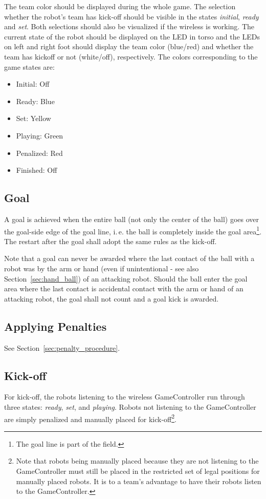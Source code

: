 \documentclass[12pt]{article}
\newcommand{\ie}{\mbox{i.\,e.}\xspace}
\begin{document}
The team color should be displayed during the whole game. The
selection whether the robot's team has kick-off should be visible in
the states \emph{initial}, \emph{ready} and \emph{set}. Both
selections should also be visualized if the wireless is working. The current state of the robot should be displayed on the LED in torso and the LEDs on left and right foot should display the team color (blue/red) and whether the team has kickoff or not (white/off), respectively. The colors corresponding to the game states are:

\begin{itemize}
 \item Initial: Off
 \item Ready: Blue
 \item Set: Yellow
 \item Playing: Green
 \item Penalized: Red
 \item Finished: Off
\end{itemize}

\subsection{Goal}
A goal is achieved when the entire ball (not only the center of the
ball) goes over the goal-side edge of the goal line, \ie the ball
is completely inside the goal area\footnote{The goal line is part of
the field.}. The restart after the goal shall adopt the same
rules as the kick-off.

Note that a goal can never be awarded where the last contact of the ball with a robot was by the arm or hand (even if unintentional - see also Section~\ref{sec:hand_ball}) of an attacking robot. Should the ball enter the goal area where the last contact is accidental contact with the arm or hand of an attacking robot, the goal shall not count and a goal kick is awarded.

\subsection{Applying Penalties}
See Section~\ref{sec:penalty_procedure}.

\subsection{Kick-off}
\label{sec:kick-off}

For kick-off, the robots listening to the wireless GameController
run through three states: \emph{ready},
\emph{set}, and \emph{playing}.  Robots not listening to the
GameController are simply penalized and manually placed for kick-off\footnote{
Note that robots being manually placed because they are not listening to the
GameController must still be placed in the restricted set of legal positions
for manually placed robots.  It is to a team's advantage to have their robots
listen to the GameController.}.
\end{document}
